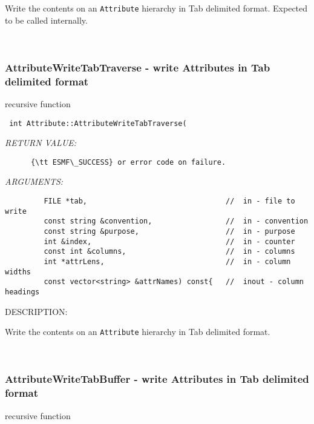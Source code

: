       Write the contents on an {\tt Attribute} hierarchy in Tab delimited format.
      Expected to be called internally.
   
 
\mbox{}\hrulefill\
 
\subsubsection [AttributeWriteTabTraverse] {AttributeWriteTabTraverse - write Attributes in Tab delimited format}


                                               recursive function
  
\begin{verbatim} int Attribute::AttributeWriteTabTraverse(\end{verbatim}{\em RETURN VALUE:}
\begin{verbatim}      {\tt ESMF\_SUCCESS} or error code on failure.\end{verbatim}{\em ARGUMENTS:}
\begin{verbatim}         FILE *tab,                                //  in - file to write
         const string &convention,                 //  in - convention
         const string &purpose,                    //  in - purpose
         int &index,                               //  in - counter
         const int &columns,                       //  in - columns
         int *attrLens,                            //  in - column widths
         const vector<string> &attrNames) const{   //  inout - column headings\end{verbatim}
{\sf DESCRIPTION:\\ }


      Write the contents on an {\tt Attribute} hierarchy in Tab delimited format.
   
 
\mbox{}\hrulefill\
 
\subsubsection [AttributeWriteTabBuffer] {AttributeWriteTabBuffer - write Attributes in Tab delimited format}


                                               recursive function
  

